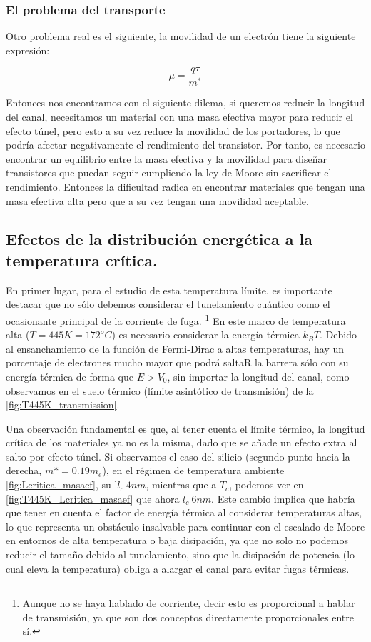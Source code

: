 \subsubsection*{El problema del transporte}
Otro problema real es el siguiente, la movilidad de un electrón tiene la siguiente expresión:

\begin{equation}
    \mu = \frac{q \tau}{m^*}
\end{equation}

Entonces nos encontramos con el siguiente dilema, si queremos reducir la longitud del canal, necesitamos un material con una masa efectiva mayor para reducir el efecto túnel, pero esto a su vez reduce la movilidad de los portadores, lo que podría afectar negativamente el rendimiento del transistor. Por tanto, es necesario encontrar un equilibrio entre la masa efectiva y la movilidad para diseñar transistores que puedan seguir cumpliendo la ley de Moore sin sacrificar el rendimiento. Entonces la dificultad radica en encontrar materiales que tengan una masa efectiva alta pero que a su vez tengan una movilidad aceptable. \cite{sze2006physics}

\subsection{Efectos de la distribución energética a la temperatura crítica.}

En primer lugar, para el estudio de esta temperatura límite, es importante destacar que no sólo debemos considerar el tunelamiento cuántico como el ocasionante principal de la corriente de fuga. \footnote{Aunque no se haya hablado de corriente, decir esto es proporcional a hablar de transmisión, ya que son dos conceptos directamente proporcionales entre sí.}
En este marco de temperatura alta ($T = 445K = 172 ^o C$) es necesario considerar la energía térmica $k_B T$. Debido al ensanchamiento de la función de Fermi-Dirac a altas temperaturas, hay un porcentaje de electrones mucho mayor que podrá saltaR la barrera sólo con su energía térmica de forma que $E > V_0$, sin importar la longitud del canal, como observamos en el suelo térmico (límite asintótico de transmisión) de la \autoref{fig:T445K_transmission}. 


Una observación fundamental es que, al tener cuenta el límite térmico, la longitud crítica de los materiales ya no es la misma, dado que se añade un efecto extra al salto por efecto túnel. Si observamos el caso del silicio (segundo punto hacia la derecha, $m* = 0.19 m_e$), en el régimen de temperatura ambiente \ref{fig:Lcritica_masaef}, su l$l_c~4nm$, mientras que a $T_c$, podemos ver en \ref{fig:T445K_Lcritica_masaef} que ahora $l_c ~ 6nm$. Este cambio implica que habría que tener en cuenta el factor de energía térmica al considerar temperaturas altas, lo que representa un obstáculo insalvable para continuar con el escalado de Moore en entornos de alta temperatura o baja disipación, ya que no solo no podemos reducir el tamaño debido al tunelamiento, sino que la disipación de potencia (lo cual eleva la temperatura) obliga a alargar el canal para evitar fugas térmicas. 

